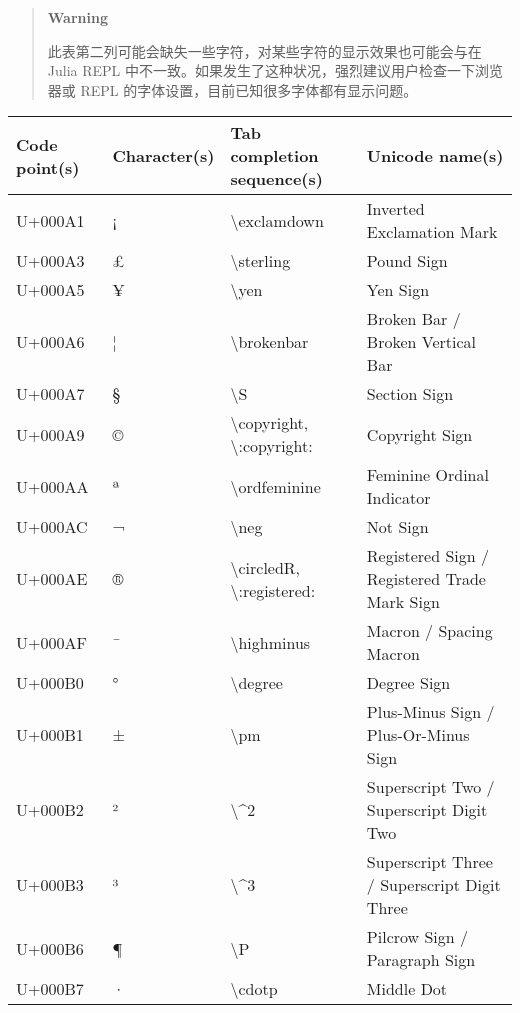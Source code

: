 \begin{quote}
\textbf{Warning}

此表第二列可能会缺失一些字符，对某些字符的显示效果也可能会与在 Julia REPL 中不一致。如果发生了这种状况，强烈建议用户检查一下浏览器或 REPL 的字体设置，目前已知很多字体都有显示问题。

\end{quote}



\begin{table}[h]

\begin{tabulary}{\linewidth}{|L|L|L|L|}
\hline
Code point(s) & Character(s) & Tab completion sequence(s) & Unicode name(s) \\
\hline
U+000A1 & ¡ & {\textbackslash}exclamdown & Inverted Exclamation Mark \\
\hline
U+000A3 & £ & {\textbackslash}sterling & Pound Sign \\
\hline
U+000A5 & ¥ & {\textbackslash}yen & Yen Sign \\
\hline
U+000A6 & ¦ & {\textbackslash}brokenbar & Broken Bar / Broken Vertical Bar \\
\hline
U+000A7 & § & {\textbackslash}S & Section Sign \\
\hline
U+000A9 & © & {\textbackslash}copyright, {\textbackslash}:copyright: & Copyright Sign \\
\hline
U+000AA & ª & {\textbackslash}ordfeminine & Feminine Ordinal Indicator \\
\hline
U+000AC & ¬ & {\textbackslash}neg & Not Sign \\
\hline
U+000AE & ® & {\textbackslash}circledR, {\textbackslash}:registered: & Registered Sign / Registered Trade Mark Sign \\
\hline
U+000AF & ¯ & {\textbackslash}highminus & Macron / Spacing Macron \\
\hline
U+000B0 & ° & {\textbackslash}degree & Degree Sign \\
\hline
U+000B1 & ± & {\textbackslash}pm & Plus-Minus Sign / Plus-Or-Minus Sign \\
\hline
U+000B2 & ² & {\textbackslash}{\textasciicircum}2 & Superscript Two / Superscript Digit Two \\
\hline
U+000B3 & ³ & {\textbackslash}{\textasciicircum}3 & Superscript Three / Superscript Digit Three \\
\hline
U+000B6 & ¶ & {\textbackslash}P & Pilcrow Sign / Paragraph Sign \\
\hline
U+000B7 & · & {\textbackslash}cdotp & Middle Dot \\

\end{tabulary}
\end{table}
